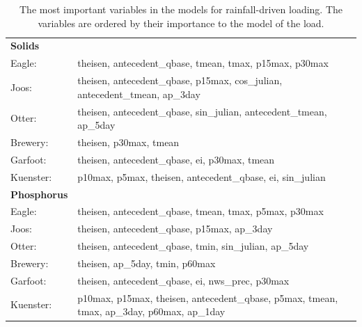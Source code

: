 \documentclass[12pt]{article}
\begin{document}
\begin{table}[h!]\small
    \begin{center}
    \begin{tabular}{ll}
        \textbf{Solids} & \\
        \hspace{5mm} Eagle: & theisen, antecedent\_qbase, tmean, tmax, p15max, p30max\\
        \hspace{5mm} Joos: & theisen, antecedent\_qbase, p15max, cos\_julian, antecedent\_tmean, ap\_3day\\
        \hspace{5mm} Otter: & theisen, antecedent\_qbase, sin\_julian, antecedent\_tmean, ap\_5day\\
        \hspace{5mm} Brewery: & theisen, p30max, tmean\\
        \hspace{5mm} Garfoot: & theisen, antecedent\_qbase, ei, p30max, tmean\\
        \hspace{5mm} Kuenster: & p10max, p5max, theisen, antecedent\_qbase, ei, sin\_julian
    \vspace{2mm}\\
        \textbf{Phosphorus} & \\
        \hspace{5mm} Eagle: & theisen, antecedent\_qbase, tmean, tmax, p5max, p30max\\
        \hspace{5mm} Joos: & theisen, antecedent\_qbase, p15max, ap\_3day\\
        \hspace{5mm} Otter: & theisen, antecedent\_qbase, tmin, sin\_julian, ap\_5day\\
        \hspace{5mm} Brewery: & theisen, ap\_5day, tmin, p60max\\
        \hspace{5mm} Garfoot: & theisen, antecedent\_qbase, ei, nws\_prec, p30max\\
        \hspace{5mm} Kuenster: & p10max, p15max, theisen, antecedent\_qbase, p5max, tmean, tmax, ap\_3day, p60max, ap\_1day\\
    \end{tabular}
    \caption{The most important variables in the models for rainfall-driven loading. The variables are ordered by their importance to the model of the load. \label{nosnow_predictor_list}}
    \end{center}
\end{table}
\end{document}
